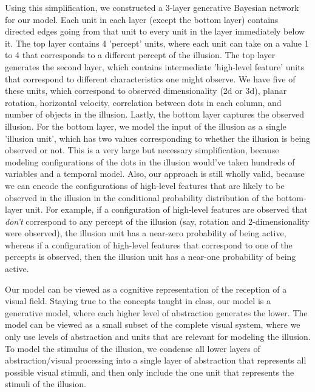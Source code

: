 \documentclass{article} %
\begin{document}
Using this simplification, we constructed a 3-layer generative Bayesian network for our model. Each unit in each layer (except the bottom layer) contains directed edges going from that unit to every unit in the layer immediately below it. The top layer contains 4 'percept' units, where each unit can take on a value 1 to 4 that corresponds to a different percept of the illusion. The top layer generates the second layer, which contains intermediate 'high-level feature' units that correspond to different characteristics one might observe. We have five of these units, which correspond to observed dimensionality (2d or 3d), planar rotation, horizontal velocity, correlation between dots in each column, and number of objects in the illusion. Lastly, the bottom layer captures the observed illusion. For the bottom layer, we model the input of the illusion as a single 'illusion unit', which has two values corresponding to whether the illusion is being observed or not. This is a very large but necessary simplification, because modeling configurations of the dots in the illusion would've taken hundreds of variables and a temporal model. Also, our approach is still wholly valid, because we can encode the configurations of high-level features that are likely to be observed in the illusion in the conditional probability distribution of the bottom-layer unit. For example, if a configuration of high-level features are observed that \emph{don't} correspond to any percept of the illusion (say, rotation and 2-dimensionality were observed), the illusion unit has a near-zero probability of being active, whereas if a configuration of high-level features that correspond to one of the percepts is observed, then the illusion unit has a near-one probability of being active.

Our model can be viewed as a cognitive representation of the reception of a visual field. Staying true to the concepts taught in class, our model is a generative model, where each higher level of abstraction generates the lower. The model can be viewed as a small subset of the complete visual system, where we only use levels of abstraction and units that are relevant for modeling the illusion. To model the stimulus of the illusion, we condense all lower layers of abstraction/visual processing into a single layer of abstraction that represents all possible visual stimuli, and then only include the one unit that represents the stimuli of the illusion. 
\end{document}

